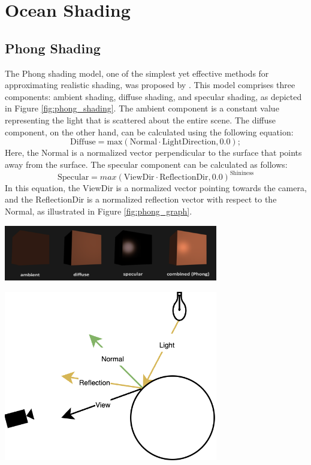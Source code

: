 \section{Ocean Shading}
\subsection{Phong Shading}
The Phong shading model, one of the simplest yet effective methods for approximating realistic shading, was proposed by \cite[Phong Bui Tuong, 1975]{phong1975}. This model comprises three components: ambient shading, diffuse shading, and specular shading, as depicted in Figure \ref{fig:phong_shading}.
The ambient component is a constant value representing the light that is scattered about the entire scene. The diffuse component, on the other hand, can be calculated using the following equation:
\begin{equation}
    \text{Diffuse} = \text{max}(\text{Normal} \cdot \text{LightDirection}, 0.0);
\end{equation}
Here, the Normal is a normalized vector perpendicular to the surface that points away from the surface.
The specular component can be calculated as follows:
\begin{equation}
    \text{Specular} = max(\text{ViewDir} \cdot \text{ReflectionDir}, 0.0)^{\text{Shininess}}
\end{equation}
In this equation, the ViewDir is a normalized vector pointing towards the camera, and the ReflectionDir is a normalized reflection vector with respect to the Normal, as illustrated in Figure \ref{fig:phong_graph}.

\begin{minipage}{1\textwidth}
    \centering
    \includegraphics[width=0.7\textwidth]{"images/phong_shading.png"}
    \label{fig:phong_shading}
\end{minipage}

\begin{minipage}{1\textwidth}
    \centering
    \includegraphics[width=0.7\textwidth]{"images/phong_graph.png"}
    \label{fig:phong_graph}
\end{minipage}

